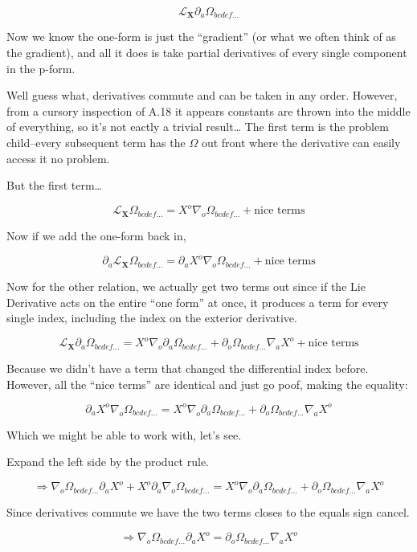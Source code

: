 \documentclass[landscape,letterpaper,10pt,english]{article}
\begin{document}
\[ \mathcal{L}_{\pmb X} \partial_a \Omega_{bcdef...} \]

Now we know the one-form is just the ``gradient'' (or what we often
think of as the gradient), and all it does is take partial derivatives
of every single component in the p-form.

Well guess what, derivatives commute and can be taken in any order.
However, from a cursory inspection of A.18 it appears constants are
thrown into the middle of everything, so it's not eactly a trivial
result\ldots{} The first term is the problem child--every subsequent
term has the \(\Omega\) out front where the derivative can easily access
it no problem.

But the first term\ldots{}

\[ \mathcal{L}_{\pmb X} \Omega_{bcdef...} = X^o \nabla_o \Omega_{bcdef...} + \text{nice terms} \]

Now if we add the one-form back in,

\[ \partial_a \mathcal{L}_{\pmb X} \Omega_{bcdef...} = \partial_a X^o \nabla_o \Omega_{bcdef...} + \text{nice terms} \]

Now for the other relation, we actually get two terms out since if the
Lie Derivative acts on the entire ``one form'' at once, it produces a
term for every single index, including the index on the exterior
derivative.

\[  \mathcal{L}_{\pmb X} \partial_a \Omega_{bcdef...} = X^o \nabla_o \partial_a \Omega_{bcdef...} + \partial_o \Omega_{bcdef...}\nabla_a X^o + \text{nice terms} \]

Because we didn't have a term that changed the differential index
before. However, all the ``nice terms'' are identical and just go poof,
making the equality:

\[ \partial_a X^o \nabla_o \Omega_{bcdef...} = X^o \nabla_o \partial_a \Omega_{bcdef...} + \partial_o \Omega_{bcdef...}\nabla_a X^o \]

Which we might be able to work with, let's see.

    Expand the left side by the product rule.

\[ \Rightarrow \nabla_o \Omega_{bcdef...} \partial_a X^o + X^o \partial_a \nabla_o \Omega_{bcdef...} = X^o \nabla_o \partial_a \Omega_{bcdef...} + \partial_o \Omega_{bcdef...}\nabla_a X^o \]

Since derivatives commute we have the two terms closes to the equals
sign cancel.

\[ \Rightarrow \nabla_o \Omega_{bcdef...} \partial_a X^o  = \partial_o \Omega_{bcdef...}\nabla_a X^o \]
\end{document}
